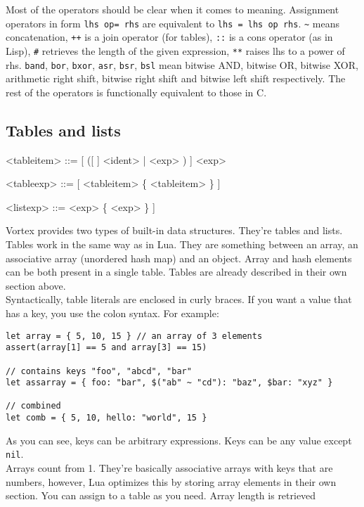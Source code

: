 \documentclass{article}
\newenvironment{bnf}
{
\begin{mdframed}
\begin{grammar}
}
{
\end{grammar}
\end{mdframed}
}
\begin{document}
Most of the operators should be clear when it comes to meaning. Assignment
operators in form \verb|lhs op= rhs| are equivalent to \verb|lhs = lhs op rhs|.
\verb|~| means concatenation, \verb|++| is a join operator (for tables),
\verb|::| is a cons operator (as in Lisp), \verb|#| retrieves the length
of the given expression, \verb|**| raises lhs to a power of rhs. \verb|band|,
\verb|bor|, \verb|bxor|, \verb|asr|, \verb|bsr|, \verb|bsl| mean bitwise AND,
bitwise OR, bitwise XOR, arithmetic right shift, bitwise right shift and
bitwise left shift respectively. The rest of the operators is functionally
equivalent to those in C.
\subsection{Tables and lists}
\begin{bnf}
<tableitem> ::= [ ([ \lit{\$} ] <ident> | \lit{\$(} <exp> \lit{)})
    \lit{:} ] <exp>

<tableexp> ::= \lit{\{} [ <tableitem> \{ \lit{,} <tableitem> \} ] \lit{\}}

<listexp> ::= \lit{[} <exp> \{ \lit{,} <exp> \} ] \lit{]}
\end{bnf}
Vortex provides two types of built-in data structures. They're tables and
lists.\\
Tables work in the same way as in Lua. They are something between an array,
an associative array (unordered hash map) and an object. Array and hash
elements can be both present in a single table. Tables are already described
in their own section above.\\
Syntactically, table literals are enclosed in curly braces. If you want a
value that has a key, you use the colon syntax. For example:
\begin{lstlisting}[language=vortex]
let array = { 5, 10, 15 } // an array of 3 elements
assert(array[1] == 5 and array[3] == 15)

// contains keys "foo", "abcd", "bar"
let assarray = { foo: "bar", $("ab" ~ "cd"): "baz", $bar: "xyz" }

// combined
let comb = { 5, 10, hello: "world", 15 } 
\end{lstlisting}
As you can see, keys can be arbitrary expressions. Keys can be any value
except \verb|nil|.\\
Arrays count from 1. They're basically associative arrays with keys that
are numbers, however, Lua optimizes this by storing array elements in their
own section. You can assign to a table as you need. Array length is retrieved
\end{document}
